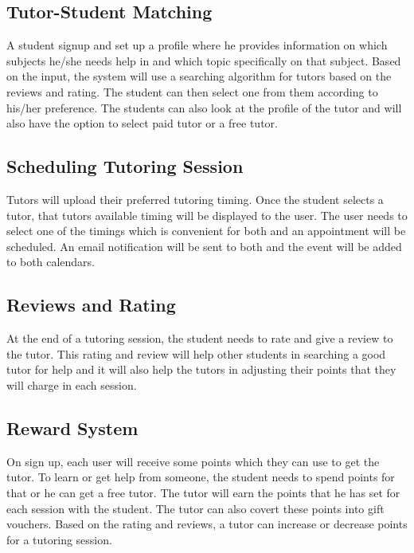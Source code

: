 \documentclass{sig-alternate-05-2015}
\begin{document}
\subsection{Tutor-Student Matching}
A student signup and set up a profile where he provides information on which subjects he/she needs help in and which topic specifically on that subject. Based on the input, the system will use a searching algorithm for tutors based on the reviews and rating. The student can then select one from them according to his/her preference. The students can also look at the profile of the tutor and will also have the option to select paid tutor or a free tutor.

\subsection{Scheduling Tutoring Session}
Tutors will upload their preferred tutoring timing. Once the student selects a tutor, that tutors available timing will be displayed to the user. The user needs to select one of the timings which is convenient for both and an appointment will be scheduled. An email notification will be sent to both and the event will be added to both calendars.
\linebreak
\subsection{Reviews and Rating}
At the end of a tutoring session, the student needs to rate and give a review to the tutor. This rating and review will help other students in searching a good tutor for help and it will also help the tutors in adjusting their points that they will charge in each session. 

\subsection{Reward System}
On sign up, each user will receive some points which they can use to get the tutor. To learn or get help from someone, the student needs to spend points for that or he can get a free tutor. The tutor will earn the points that he has set for each session with the student. The tutor can also covert these points into gift vouchers. Based on the rating and reviews, a tutor can increase or decrease points for a tutoring session.
\end{document}
